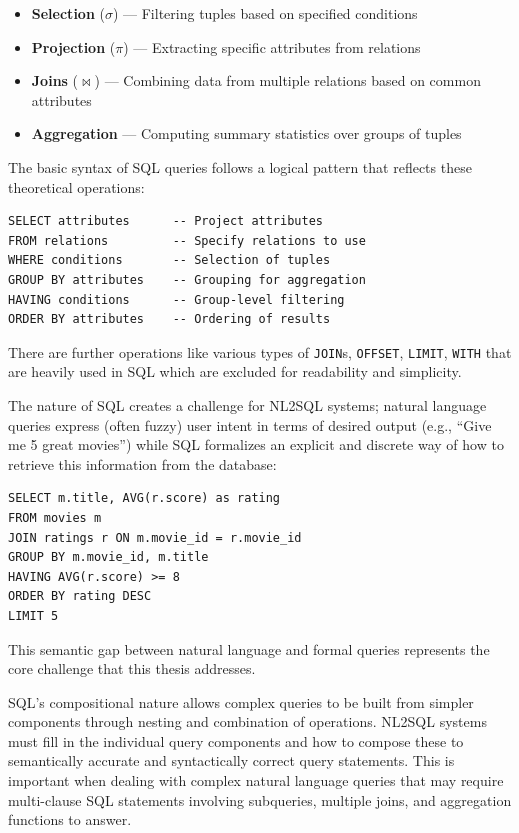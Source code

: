 \begin{itemize}
    \item \textbf{Selection} ($\sigma$) — Filtering tuples based on specified
        conditions
    \item \textbf{Projection} ($\pi$) — Extracting specific attributes from
        relations
    \item \textbf{Joins} ($\bowtie$) — Combining data from multiple relations
        based on common attributes
    \item \textbf{Aggregation} — Computing summary statistics over groups of
        tuples
\end{itemize}

The basic syntax of SQL queries follows a logical pattern that reflects these
theoretical operations:

\begin{verbatim}
SELECT attributes      -- Project attributes
FROM relations         -- Specify relations to use
WHERE conditions       -- Selection of tuples
GROUP BY attributes    -- Grouping for aggregation
HAVING conditions      -- Group-level filtering
ORDER BY attributes    -- Ordering of results
\end{verbatim}

There are further operations like various types of \texttt{JOIN}s,
\texttt{OFFSET}, \texttt{LIMIT}, \texttt{WITH} that are heavily used in SQL
which are excluded for readability and simplicity.

The nature of SQL creates a challenge for NL2SQL systems; natural language
queries express (often fuzzy) user intent in terms of desired output (e.g.,
``Give me 5 great movies'') while SQL formalizes an explicit and discrete way
of how to retrieve this information from the database:

\begin{verbatim}
SELECT m.title, AVG(r.score) as rating
FROM movies m
JOIN ratings r ON m.movie_id = r.movie_id
GROUP BY m.movie_id, m.title
HAVING AVG(r.score) >= 8
ORDER BY rating DESC
LIMIT 5
\end{verbatim}

This semantic gap between natural language and formal queries represents the
core challenge that this thesis addresses.

SQL's compositional nature allows complex queries to be built from simpler
components through nesting and combination of operations. NL2SQL systems must
fill in the individual query components and how to compose these to
semantically accurate and syntactically correct query statements. This is
important when dealing with complex natural language queries that may require
multi-clause SQL statements involving subqueries, multiple joins, and
aggregation functions to answer.

